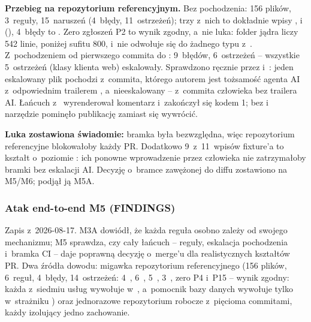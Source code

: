 \textbf{Przebieg na repozytorium referencyjnym.} Bez pochodzenia: 156 plików, 3~reguły,
15~naruszeń (4~błędy, 11~ostrzeżeń); trzy z~nich to dokładnie wpisy
,  i~
(), 4~błędy to .
Zero zgłoszeń P2 to wynik zgodny, a~nie luka: folder jądra liczy 542 linie, poniżej sufitu
800, i~nie odwołuje się do żadnego typu z~.
Z~pochodzeniem od pierwszego commita do : 9~błędów, 6~ostrzeżeń -- wszystkie
5~ostrzeżeń  (klasy klienta web) eskalowały.
Sprawdzono ręcznie przez  i~: jeden eskalowany plik
pochodzi z~commita, którego autorem jest tożsamość agenta AI z~odpowiednim trailerem
, a~nieeskalowany  -- z~commita człowieka bez
trailera AI. Łańcuch z~ wyrenderował komentarz i~zakończył się
kodem 1; bez  i~ narzędzie pominęło publikację zamiast
się wywrócić.

\textbf{Luka zostawiona świadomie:} bramka była bezwzględna, więc repozytorium referencyjne
blokowałoby każdy PR. Dodatkowo 9~z~11~wpisów fixture'a to kształt
 o~poziomie : ich ponowne wprowadzenie przez
człowieka nie zatrzymałoby bramki bez eskalacji AI. Decyzję o~bramce zawężonej do diffu
zostawiono na M5/M6; podjął ją M5A.

\subsubsection{Atak end-to-end M5 (FINDINGS)}

Zapis z~2026-08-17. M3A dowiódł, że każda reguła osobno zależy od swojego mechanizmu; M5
sprawdza, czy cały łańcuch -- reguły, eskalacja pochodzenia i~bramka CI -- daje poprawną
decyzję o~merge'u dla realistycznych kształtów PR. Dwa źródła dowodu: migawka repozytorium
referencyjnego (156 plików, 6~reguł, 4~błędy, 14~ostrzeżeń: 4~,
6~, 5~, 3~,
zero P4 i~P15 -- wynik zgodny: każda z~siedmiu usług wywołuje 
w~, a~pomocnik bazy danych wywołuje 
tylko w~strażniku ) oraz jednorazowe repozytorium robocze z~pięcioma
commitami, każdy izolujący
jedno zachowanie.

